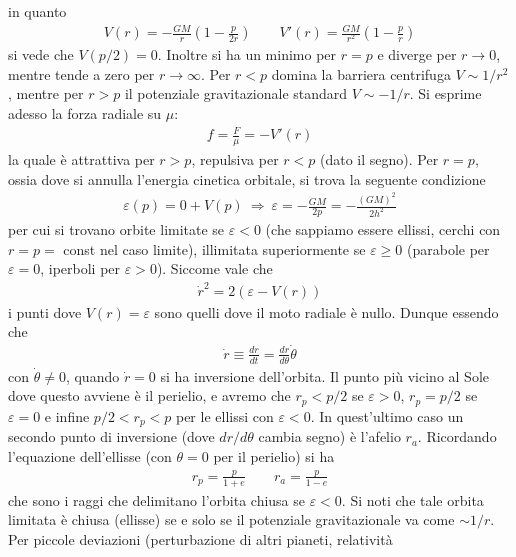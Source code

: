\documentclass[a4paper, oneside]{book}
\begin{document}
in quanto
\begin{gather*}
    V(r) = - \frac{GM}{r} \left(1 - \frac{p}{2r}\right) \qquad V'(r) = \frac{GM}{r^{2}} \left(1 - \frac{p}{r}\right)
\end{gather*}
si vede che $V(p/2) = 0$. Inoltre si ha un minimo per $r = p$ e diverge per $r \to 0$, mentre tende a zero per $r \to \infty $.
Per $r < p$ domina la barriera centrifuga $ V \sim 1/r^{2}$, mentre per $r > p$ il potenziale 
gravitazionale standard $V \sim - 1/r$. Si esprime adesso la forza radiale su $\mu$: 
\begin{gather*}
    f = \frac{F}{\mu} = - V'(r)
\end{gather*}
la quale è attrattiva per $r > p$, repulsiva per $r < p$ (dato il segno). Per $r = p$, ossia 
dove si annulla l'energia cinetica orbitale, si trova la seguente condizione
\begin{gather*}
    \varepsilon(p) = 0 +V(p) \ \Longrightarrow \ \varepsilon =- \frac{GM}{2p} = -\frac{(GM)^{2}}{2h^{2}}
\end{gather*} 
per cui si trovano orbite limitate se $\varepsilon < 0$ (che sappiamo essere ellissi, cerchi con $r = p =$ const nel caso limite), 
illimitata superiormente se $\varepsilon \geq 0$ (parabole per $\varepsilon = 0$, 
iperboli per $\varepsilon > 0$). Siccome vale che 
\begin{gather*}
    \dot{r}^{2} = 2\left(\varepsilon - V(r)\right) 
\end{gather*} 
i punti dove $V(r) = \varepsilon$ sono quelli dove il moto radiale 
è nullo. Dunque essendo che
\begin{gather*}
    \dot{r} \equiv \frac{dr}{dt} = \frac{dr}{d\theta} \dot{\theta}  
\end{gather*}
con $\dot{\theta} \neq 0$, quando $\dot{r} = 0$ si ha inversione dell'orbita.
Il punto più vicino al Sole dove questo avviene è il perielio, e 
avremo che $r_p < p/2$ se $\varepsilon > 0$, $r_p = p/2$ se $\varepsilon = 0$
e infine $p/2 < r_p < p$ per le ellissi con $\varepsilon < 0$. In quest'ultimo caso 
un secondo punto di inversione (dove $dr/d\theta$ cambia segno) è l'afelio $r_a$. 
Ricordando l'equazione dell'ellisse (con $\theta = 0$ per il perielio) si ha 
\begin{gather*}
    r_p = \frac{p}{1 + e} \qquad r_a = \frac{p}{1 - e}
\end{gather*}  
che sono i raggi che delimitano l'orbita chiusa se $\varepsilon < 0$. Si noti 
che tale orbita limitata è chiusa (ellisse) se e solo se il potenziale gravitazionale 
va come $ \sim 1/r$. Per piccole deviazioni (perturbazione di altri pianeti, relatività 
\end{document}
